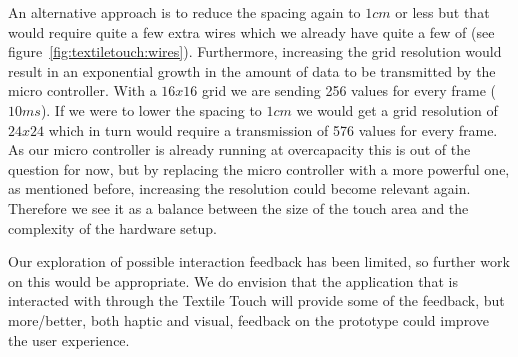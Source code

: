 An alternative approach is to reduce the spacing again to \(1cm\) or less but that would require quite a few extra wires which we already have quite a few of (see figure~\ref{fig:textiletouch:wires}).
Furthermore, increasing the grid resolution would result in an exponential growth in the amount of data to be transmitted by the micro controller.
With a \(16x16\) grid we are sending 256 values for every frame (\(10ms\)).
If we were to lower the spacing to \(1cm\) we would get a grid resolution of \(24x24\) which in turn would require a transmission of 576 values for every frame.
As our micro controller is already running at overcapacity this is out of the question for now, but by replacing the micro controller with a more powerful one, as mentioned before, increasing the resolution could become relevant again.
Therefore we see it as a balance between the size of the touch area and the complexity of the hardware setup.

Our exploration of possible interaction feedback has been limited, so further work on this would be appropriate.
We do envision that the application that is interacted with through the Textile Touch will provide some of the feedback, but more/better, both haptic and visual, feedback on the prototype could improve the user experience. 
